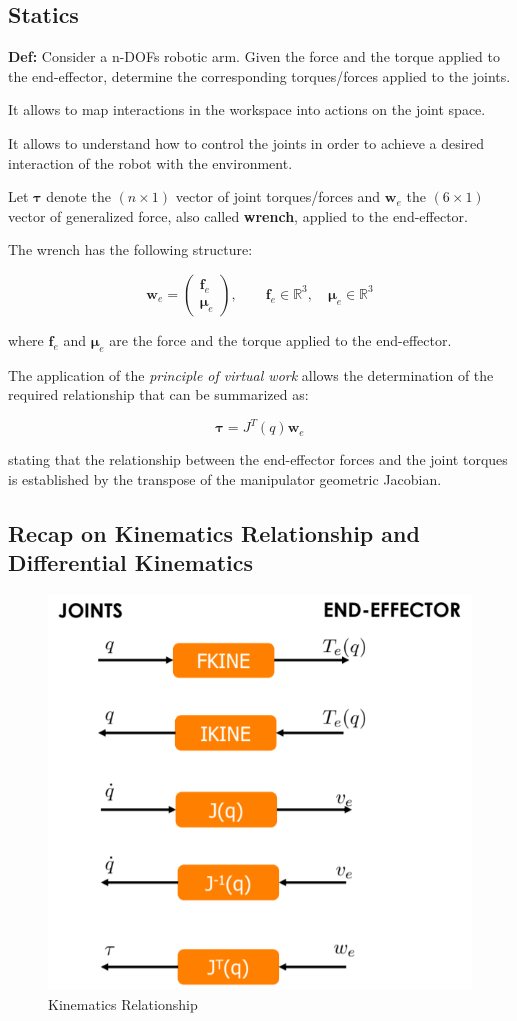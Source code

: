 \subsection{Statics}

\textbf{Def:} Consider a n-DOFs robotic arm. Given the force and the torque applied to the end-effector, determine the corresponding torques/forces applied to the joints.

It allows to map interactions in the workspace into actions on the joint space.

It allows to understand how to control the joints in order to achieve a desired interaction of the robot with the environment.

Let $\boldsymbol{\tau}$ denote the $(n \times 1)$ vector of joint torques/forces and $\boldsymbol{w}_e$ the $(6 \times 1)$ vector of generalized force, also called \textbf{wrench}, applied to the end-effector. 

The wrench has the following structure:

\[
\boldsymbol{w}_e =
\begin{pmatrix}
\boldsymbol{f}_e \\
\boldsymbol{\mu}_e
\end{pmatrix}, 
\qquad \boldsymbol{f}_e \in \mathbb{R}^3, \quad 
\boldsymbol{\mu}_e \in \mathbb{R}^3
\]

where $\boldsymbol{f}_e$ and $\boldsymbol{\mu}_e$ are the force and the torque applied to the end-effector.

The application of the \textit{principle of virtual work} allows the determination of the required relationship that can be summarized as:

\[
\boldsymbol{\tau} = J^T(q)\boldsymbol{w}_e
\]

stating that the relationship between the end-effector forces and the joint torques is established by the transpose of the manipulator geometric Jacobian.

\hfill

\subsection{Recap on Kinematics Relationship and Differential Kinematics}

\begin{figure}[H]
    \centering
    \includegraphics[width=0.65\linewidth]{imgs/kinematic_relationship.png}
    \caption{Kinematics Relationship}
\end{figure}

